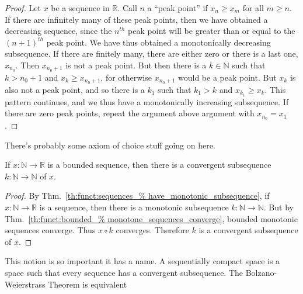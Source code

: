         \begin{proof}
            Let $x$ be a sequence in $\mathbb{R}$.
            Call $n$ a ``peak point'' if
            $x_{n}\geq{x_{m}}$ for all
            ${m}\geq{n}$. If there are infinitely many
            of these peak points, then we have obtained
            a decreasing sequence, since the $n^{th}$
            peak point will be greater than or equal to
            the $(n+1)^{th}$ peak point.
            We have thus obtained
            a monotonically decreasing subsequence.
            If there are finitely many,
            there are either zero or there is a last one,
            $x_{n_{0}}$. Then $x_{n_{0}+1}$ is not a
            peak point. But then there is a
            $k\in\mathbb{N}$ such that $k>n_{0}+1$ and
            $x_{k}\geq{x_{n_{0}+1}}$, for otherwise
            $x_{n_{0}+1}$ would be a peak point. But
            $x_{k}$ is also not a peak point, and so
            there is a $k_{1}$ such that $k_{1}>k$ and
            $x_{k_{1}}\geq{x_{k}}$. This pattern
            continues, and we thus have a monotonically
            increasing subsequence. If there are zero
            peak points, repeat the argument above
            argument with $x_{n_{0}}=x_{1}$.
        \end{proof}
        There's probably some axiom of choice stuff
        going on here.
        \begin{theorem}
            If $x:\mathbb{N}\rightarrow\mathbb{R}$
            is a bounded sequence, then there is
            a convergent subsequence
            $k:\mathbb{N}\rightarrow\mathbb{N}$
            of $x$.
        \end{theorem}
        \begin{proof}
            By Thm.~\ref{th:funct:sequences_%
                         have_monotonic_subsequence},
            if $x:\mathbb{N}\rightarrow\mathbb{R}$ is a
            sequence, then there is a monotonic subsequence
            $k:\mathbb{N}\rightarrow\mathbb{N}$.
            But by Thm.~\ref{th:funct:bounded_%
                             monotone_sequences_converge},
            bounded monotonic sequences converge.
            Thus $x\circ{k}$ converges.
            Therefore $k$ is a convergent
            subsequence of $x$.
        \end{proof}
        This notion is so important it has a name.
        A sequentially compact space is a space such that
        every sequence has a convergent subsequence. The
        Bolzano-Weierstrass Theorem is equivalent
